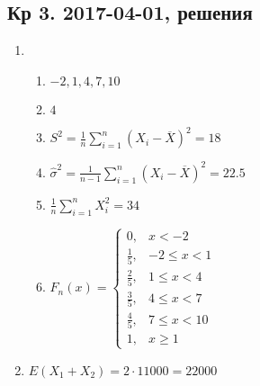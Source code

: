 \subsection{Кр 3. 2017-04-01, решения}

\begin{enumerate}
\item
\begin{enumerate}
\item $-2, 1, 4, 7, 10$
\item $4$
\item $S^2 = \frac{1}{n} \sum_{i=1}^n (X_i - \overline{X})^2 = 18$
\item $\hat\sigma^2 = \frac{1}{n-1} \sum_{i=1}^n (X_i - \overline{X})^2 = 22.5$
\item $\frac{1}{n} \sum_{i=1}^n X_i^2 = 34$
\item $F_n(x) = \begin{cases}
0, & x < -2 \\
\frac{1}{5}, & -2 \leq x < 1 \\
\frac{2}{5}, & 1 \leq x < 4 \\
\frac{3}{5}, & 4 \leq x < 7 \\
\frac{4}{5}, & 7 \leq x < 10 \\
1, & x \geq 1
\end{cases}$
\end{enumerate}
\item $E(X_1 + X_2) = 2 \cdot 11000 = 22000$


\end{enumerate}
